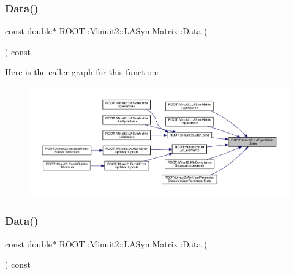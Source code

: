 \subsubsection{\texorpdfstring{Data()}{Data()}\hspace{0.1cm}{\footnotesize\ttfamily [1/6]}}
{\footnotesize\ttfamily const double$\ast$ R\+O\+O\+T\+::\+Minuit2\+::\+L\+A\+Sym\+Matrix\+::\+Data (\begin{DoxyParamCaption}{ }\end{DoxyParamCaption}) const\hspace{0.3cm}{\ttfamily [inline]}}

Here is the caller graph for this function\+:
\nopagebreak
\begin{figure}[H]
\begin{center}
\leavevmode
\includegraphics[width=350pt]{d3/d72/classROOT_1_1Minuit2_1_1LASymMatrix_ab1fb932a4ad517108a3b58473b6d8803_icgraph}
\end{center}
\end{figure}
\mbox{\label{classROOT_1_1Minuit2_1_1LASymMatrix_ab1fb932a4ad517108a3b58473b6d8803}} 
\subsubsection{\texorpdfstring{Data()}{Data()}\hspace{0.1cm}{\footnotesize\ttfamily [2/6]}}
{\footnotesize\ttfamily const double$\ast$ R\+O\+O\+T\+::\+Minuit2\+::\+L\+A\+Sym\+Matrix\+::\+Data (\begin{DoxyParamCaption}{ }\end{DoxyParamCaption}) const\hspace{0.3cm}{\ttfamily [inline]}}

\mbox{\label{classROOT_1_1Minuit2_1_1LASymMatrix_ab1fb932a4ad517108a3b58473b6d8803}} 
